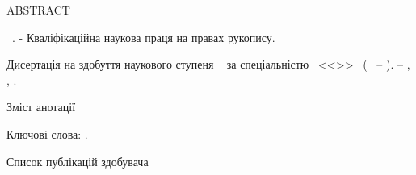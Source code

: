 \noindent
ABSTRACT						

\vspace{0.7cm}
\noindent
\thesisAuthorFIOen~\thesisTitle. - Кваліфікаційна наукова праця на правах рукопису.

\vspace{0.7cm}
\noindent
Дисертація на здобуття наукового ступеня \thesisDegree~
за спеціальністю \thesisSpecialtyNumber~<<\thesisSpecialtyTitle>>~
(\thesisKnowledgeNumber~ -- \thesisKnowledgeTitle). -- \thesisOrganizationEn, \thesisCityEn, \thesisYear.

\vspace{0.7cm}
Зміст анотації

\vspace{0.7cm}
\noindent
Ключові слова: \keywordsEn.

\vspace{0.7cm}
Список публікацій здобувача



\clearpage
